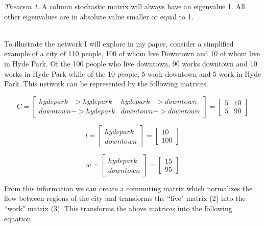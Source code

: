 \documentclass{article}
\theoremstyle{definition}
\theoremstyle{remark}
\newtheorem{theorem}{Theorem}
\begin{document}
\begin{theorem}
A column stochastic matrix will always have an eigenvalue 1. All other eigenvalues are in absolute
value smaller or equal to 1.
\end{theorem}

\\ 

To illustrate the network I will explore in my paper, consider a simplified example of a city of 110 people, 100 of whom live Downtown and 10 of whom live in Hyde Park.  Of the 100 people who live downtown, 90 works downtown and 10 works in Hyde Park while of the 10 people, 5 work downtown and 5 work in Hyde Park.  This network can be represented by the following matrices. 

\begin{equation}
      C
   =
  \begin{bmatrix}
    hyde park->hyde park  & hyde park->downtown\\
    downtown->hyde park  & downtown->downtown
  \end{bmatrix} = 
  \begin{bmatrix}
    5 & 10\\
    5 & 90 
  \end{bmatrix}
\end{equation}

\begin{equation}
      l
   =
  \begin{bmatrix}
    hyde park\\
    downtown
    
  \end{bmatrix} = 
  \begin{bmatrix}
    10\\
    100 
  \end{bmatrix}
\end{equation}

\begin{equation}
      w
   =
  \begin{bmatrix}
    hyde park\\
    downtown
  \end{bmatrix} = 
  \begin{bmatrix}
    15\\
    95
  \end{bmatrix}
\end{equation}

From this information we can create a commuting matrix which normalizes the flow between regions of the city and transforms the ``live" matrix (2) into the ``work" matrix (3).  This transforms the above matrices into the following equation.
\end{document}
